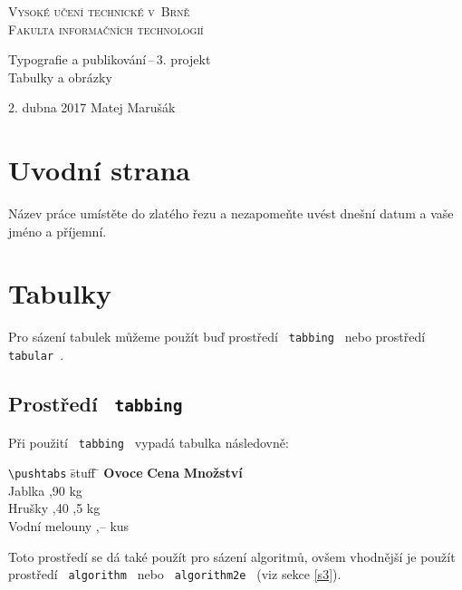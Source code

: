 \documentclass[a4paper, 11pt] {article}
\begin{document}
\begin{titlepage}
\begin{center}

\newtheorem{definicia}{Definice}[section]
\newtheorem{algoritmus}[definicia]{Algoritmus}
\newtheorem{veta}{Věta}




{\Huge \textsc{Vysoké učení technické v~Brně\\
Fakulta informačních technologií}}\\


{\LARGE
	Typografie a publikování\,--\,3. projekt\\
	Tabulky a obrázky\\
}

\end{center}

{\LARGE 2. dubna 2017     \hfill     Matej Marušák}
\end{titlepage}

\section{Uvodní strana}
Název práce umístěte do zlatého řezu a nezapomeňte uvést dnešní datum a vaše jméno a příjemní.

\section{Tabulky}
Pro sázení tabulek můžeme použít buď prostředí \texttt{ tabbing } nebo prostředí \texttt{ tabular }.
\subsection{Prostředí \texttt{ tabbing }}
Při použití \texttt{ tabbing } vypadá tabulka následovně:

\begin{tabbing}
\verb|\pushtabs| \qquad \= stuff  \qquad\= \kill
	\textbf{Ovoce} \> \textbf{Cena} \> \textbf{Množství}\\
	Jablka ,90  kg\\
	Hrušky ,40 ,5 kg\\
	Vodní melouny ,--  kus
\end{tabbing}

\bigskip
\noindent
Toto prostředí se dá také použít pro sázení algoritmů, ovšem vhodnější je použít prostředí \texttt{ algorithm } nebo \texttt{ algorithm2e } (viz sekce \ref{s3}).
\end{document}
